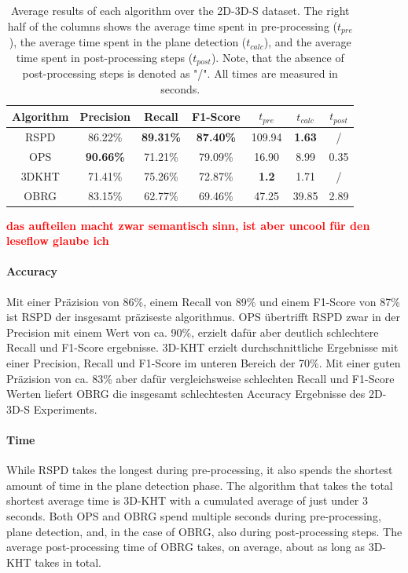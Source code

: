 \documentclass[main.tex]{subfiles}
\begin{document}
\begin{table}[H]
    \centering
    \begin{tabular}{c|cccccc}
        Algorithm & Precision        & Recall           & F1-Score         & $t_{pre}$    & $t_{calc}$    & $t_{post}$ \\ \hline
        RSPD      & 86.22\%          & \textbf{89.31\%} & \textbf{87.40\%} & 109.94       & \textbf{1.63} & /          \\
        OPS       & \textbf{90.66\%} & 71.21\%          & 79.09\%          & 16.90        & 8.99          & 0.35       \\
        3DKHT     & 71.41\%          & 75.26\%          & 72.87\%          & \textbf{1.2} & 1.71          & /          \\
        OBRG      & 83.15\%          & 62.77\%          & 69.46\%          & 47.25        & 39.85         & 2.89
    \end{tabular}
    \caption[Overall 2D-3D-S Results]{Average results of each algorithm over the 2D-3D-S dataset. The right half of the columns shows the average time spent in
        pre-processing ($t_{pre}$), the average time spent in the plane detection ($t_{calc}$), and the average time spent in post-processing steps ($t_{post}$).
        Note, that the absence of post-processing steps is denoted as "/". All times are measured in seconds.}
    \label{tab:res-3d2ds-total}
\end{table}

\textbf{\textcolor{red}{das aufteilen macht zwar semantisch sinn, ist aber uncool für den leseflow glaube ich }}

\paragraph{Accuracy}
Mit einer Präzision von 86\%, einem Recall von 89\% und einem F1-Score von 87\% ist RSPD der insgesamt präziseste algorithmus. OPS übertrifft RSPD zwar
in der Precision mit einem Wert von ca. 90\%, erzielt dafür aber deutlich schlechtere Recall und F1-Score ergebnisse.
3D-KHT erzielt durchschnittliche Ergebnisse mit einer Precision, Recall und F1-Score im unteren Bereich der 70\%.
Mit einer guten Präzision von ca. 83\% aber dafür vergleichsweise schlechten Recall und F1-Score Werten liefert OBRG die insgesamt schlechtesten
Accuracy Ergebnisse des 2D-3D-S Experiments.

\paragraph{Time}
While RSPD takes the longest during pre-processing, it also spends the shortest amount of time in the plane detection phase.
The algorithm that takes the total shortest average time is 3D-KHT with a cumulated average of just under 3 seconds.
Both OPS and OBRG spend multiple seconds during pre-processing, plane detection, and, in the case of OBRG, also during post-processing steps.
The average post-processing time of OBRG takes, on average, about as long as 3D-KHT takes in total.
\end{document}

